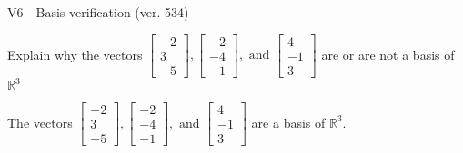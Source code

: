 \begin{exercise}
  \begin{exerciseTitle}V6 - Basis verification (ver. 534)\end{exerciseTitle}
  \begin{exerciseStatement}
    Explain why the vectors \(\left[\begin{array}{r}
-2 \\
3 \\
-5
\end{array}\right] , \left[\begin{array}{r}
-2 \\
-4 \\
-1
\end{array}\right] , \text{ and } \left[\begin{array}{r}
4 \\
-1 \\
3
\end{array}\right]\) are or are not a basis of \(\mathbb{R}^3\)	


  \end{exerciseStatement}
  \begin{exerciseAnswer}
   The vectors \(\left[\begin{array}{r}
-2 \\
3 \\
-5
\end{array}\right] , \left[\begin{array}{r}
-2 \\
-4 \\
-1
\end{array}\right] , \text{ and } \left[\begin{array}{r}
4 \\
-1 \\
3
\end{array}\right]\) 
  	 are  a basis of \(\mathbb{R}^3\).
  


  \end{exerciseAnswer}
\end{exercise}